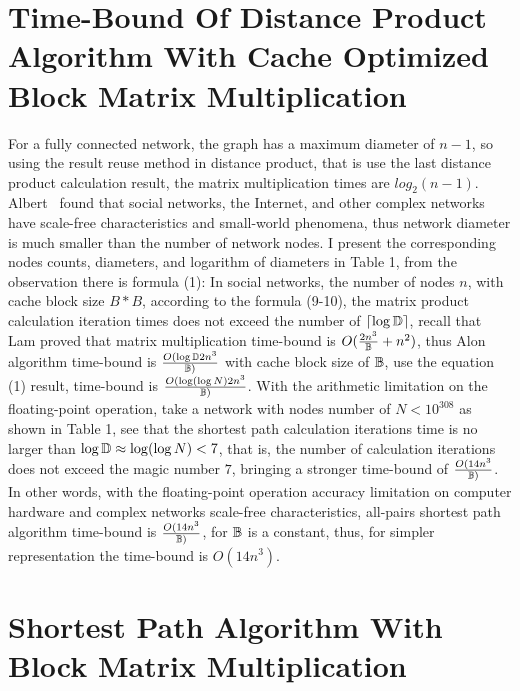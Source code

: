 \documentclass[review]{cvpr}
\begin{document}

\section{Time-Bound Of Distance Product Algorithm With Cache Optimized Block Matrix Multiplication}

For a fully connected network, the graph has a maximum diameter of $n-1$, so using the result reuse method in distance product, that is use the last distance product calculation result, the matrix multiplication times are $log_2(n-1)$.
Albert~\cite{albert1999diameter} found that social networks, the Internet, and other complex networks have scale-free characteristics and small-world phenomena, thus network diameter is much smaller than the number of network nodes.
I present the corresponding nodes counts, diameters, and logarithm of diameters in Table 1, from the observation there is formula (1):
In social networks, the number of nodes $n$, with cache block size $B*B$, according to the formula (9-10), the matrix product calculation iteration times does not exceed the number of $\lceil{\log{\Bbb D}}\rceil$, recall that Lam \etal proved that matrix multiplication time-bound is \(O({2n^3 \over \Bbb B}+{n^2})\),
thus Alon \etal algorithm time-bound is \(O(\log{\Bbb D}2n^3\over \Bbb B)\) with cache block size of $\Bbb B$, use the equation (1) result, time-bound is \(O(\log(\log{N})2n^3\over \Bbb B)\).
With the arithmetic limitation on the floating-point operation, \eg take a network with nodes number of $N<10^{308}$
as shown in Table 1, see that the shortest path calculation iterations time is no larger than $\log{\Bbb D} \approx \log(\log{N})<7$, that is, the number of calculation iterations does not exceed the magic number $7$,
bringing a stronger time-bound of \(O(14n^3\over \Bbb B)\).
In other words, with the floating-point operation accuracy limitation on computer hardware and complex networks scale-free characteristics, all-pairs shortest path algorithm time-bound is \(O(14n^3\over \Bbb B)\), for $\Bbb B$ is a constant, thus, for simpler representation the time-bound is \(O(14n^3)\).




\section{Shortest Path Algorithm With Block Matrix Multiplication}
\end{document}
